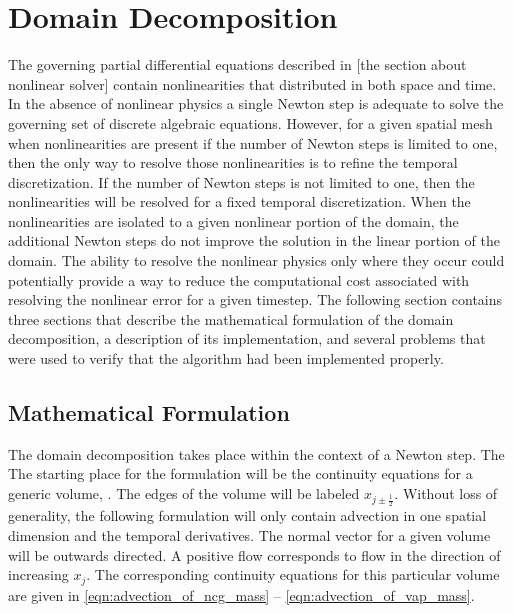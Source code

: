 \chapter{Domain Decomposition}
\label{chap:domain_decomposition}
The governing partial differential equations described in [the section about nonlinear solver] contain nonlinearities that distributed in both space and time.
In the absence of nonlinear physics a single Newton step is adequate to solve the governing set of discrete algebraic equations.
However, for a given spatial mesh when nonlinearities are present if the number of Newton steps is limited to one, then the only way to resolve those nonlinearities is to refine the temporal discretization.
If the number of Newton steps is not limited to one, then the nonlinearities will be resolved for a fixed temporal discretization.
When the nonlinearities are isolated to a given nonlinear portion of the domain, the additional Newton steps do not improve the solution in the linear portion of the domain.
The ability to resolve the nonlinear physics only where they occur could potentially provide a way to reduce the computational cost associated with resolving the nonlinear error for a given timestep.
The following section contains three sections that describe the mathematical formulation of the domain decomposition, a description of its implementation, and several problems that were used to verify that the algorithm had been implemented properly.

\section{Mathematical Formulation}
\label{sec:dd:math}

The domain decomposition takes place within the context of a Newton step.
The 
The starting place for the formulation will be the continuity equations for a generic volume,  .
The edges of the volume will be labeled $x_{j \pm \frac{1}{2}}$.
Without loss of generality, the following formulation will only contain advection in one spatial dimension and the temporal derivatives.
The normal vector for a given volume will be outwards directed.
A positive flow corresponds to flow in the direction of increasing $x_{j}$.  
The corresponding continuity equations for this particular volume are given in \eqref{eqn:advection_of_ncg_mass} -- \eqref{eqn:advection_of_vap_mass}.


